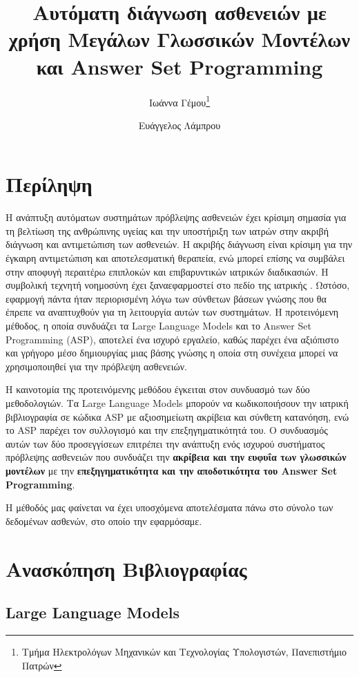 \documentclass[10pt,leqno]{amsart}
\title{Αυτόματη διάγνωση ασθενειών με χρήση Μεγάλων Γλωσσικών Μοντέλων και Answer Set Programming}
\author{Ιωάννα Γέμου\thanks{Τμήμα Ηλεκτρολόγων Μηχανικών και Τεχνολογίας Υπολογιστών, Πανεπιστήμιο Πατρών} \\ \src{ioannagemou@upnet.gr} \and Ευάγγελος Λάμπρου\footnotemark[1] \\ \src{e.lamprou@upnet.gr}}
\begin{document}
\maketitle
\tableofcontents
\newpage
\section{Περίληψη}
Η ανάπτυξη αυτόματων συστημάτων πρόβλεψης ασθενειών έχει κρίσιμη σημασία για τη βελτίωση της ανθρώπινης υγείας και την υποστήριξη των ιατρών στην ακριβή διάγνωση και αντιμετώπιση των ασθενειών. Η ακριβής διάγνωση είναι κρίσιμη για την έγκαιρη αντιμετώπιση και αποτελεσματική θεραπεία, ενώ μπορεί επίσης να συμβάλει στην αποφυγή περαιτέρω επιπλοκών και επιβαρυντικών ιατρικών διαδικασιών. 
Η συμβολική τεχνητή νοημοσύνη έχει ξαναεφαρμοστεί στο πεδίο της ιατρικής \cite{Alviano_2020}. Ωστόσο,
εφαρμογή πάντα ήταν περιορισμένη λόγω των σύνθετων βάσεων γνώσης που θα έπρεπε να αναπτυχθούν για τη λειτουργία 
αυτών των συστημάτων.
Η προτεινόμενη μέθοδος, η οποία συνδυάζει τα Large Language Models και το Answer Set Programming (ASP), αποτελεί ένα ισχυρό εργαλείο, καθώς παρέχει ένα αξιόπιστο και γρήγορο μέσο δημιουργίας μιας βάσης γνώσης η οποία 
στη συνέχεια μπορεί να χρησιμοποιηθεί για την πρόβλεψη ασθενειών.



Η καινοτομία της προτεινόμενης μεθόδου έγκειται στον συνδυασμό των δύο μεθοδολογιών. Τα Large Language Models μπορούν να κωδικοποιήσουν την ιατρική βιβλιογραφία 
σε κώδικα ASP με αξιοσημείωτη ακρίβεια και σύνθετη κατανόηση, ενώ το ASP παρέχει τον συλλογισμό και την επεξηγηματικότητά του. Ο συνδυασμός αυτών των δύο προσεγγίσεων επιτρέπει την ανάπτυξη ενός ισχυρού συστήματος πρόβλεψης ασθενειών που συνδυάζει την \textbf{ακρίβεια και την ευφυΐα των γλωσσικών μοντέλων} με την \textbf{επεξηγηματικότητα και την αποδοτικότητα του Answer Set Programming}.

Η μέθοδός μας φαίνεται να έχει υποσχόμενα αποτελέσματα πάνω στο σύνολο των δεδομένων ασθενών, στο οποίο
την εφαρμόσαμε.





\section{Ανασκόπηση Βιβλιογραφίας}

\subsection{Large Language Models}
\end{document}
